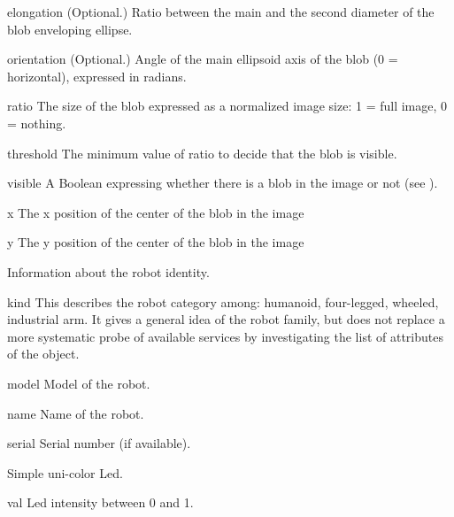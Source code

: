 \begin{urbiscriptapi}
\item[elongation]{} (Optional.)  Ratio between the main and the second
  diameter of the blob enveloping ellipse.


\item[orientation]{} (Optional.)  Angle of the main ellipsoid axis of the blob
  (0 = horizontal), expressed in radians.


\item[ratio] The size of the blob expressed as a normalized image size: 1 =
  full image, 0 = nothing.


\item[threshold] The minimum value of ratio to decide that the blob is
  visible.


\item[visible] A Boolean expressing whether there is a blob in the image or
  not (see ).


\item[x] The x position of the center of the blob in the image


\item[y] The y position of the center of the blob in the image
\end{urbiscriptapi}




Information about the robot identity.
\begin{urbiscriptapi}
\item[kind]%
  This describes the robot category among: humanoid, four-legged, wheeled,
  industrial arm. It gives a general idea of the robot family, but does not
  replace a more systematic probe of available services by investigating the
  list of attributes of the object.


\item[model] Model of the robot.


\item[name]%
  Name of the robot.


\item[serial] Serial number (if available).
\end{urbiscriptapi}



Simple uni-color Led.

\begin{urbiscriptapi}
\item[val] Led intensity between 0 and 1.
\end{urbiscriptapi}


